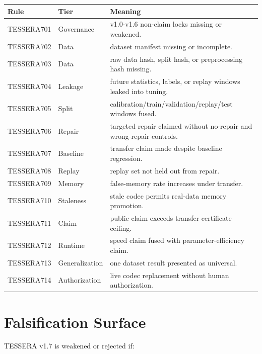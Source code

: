 \documentclass[12pt]{article}
\begin{document}
\begin{longtable}{p{}p{}p{}}
\toprule
\textbf{Rule} & \textbf{Tier} & \textbf{Meaning} \\
\midrule
TESSERA701 & Governance & v1.0-v1.6 non-claim locks missing or weakened. \\
TESSERA702 & Data & dataset manifest missing or incomplete. \\
TESSERA703 & Data & raw data hash, split hash, or preprocessing hash missing. \\
TESSERA704 & Leakage & future statistics, labels, or replay windows leaked into tuning. \\
TESSERA705 & Split & calibration/train/validation/replay/test windows fused. \\
TESSERA706 & Repair & targeted repair claimed without no-repair and wrong-repair controls. \\
TESSERA707 & Baseline & transfer claim made despite baseline regression. \\
TESSERA708 & Replay & replay set not held out from repair. \\
TESSERA709 & Memory & false-memory rate increases under transfer. \\
TESSERA710 & Staleness & stale codec permits real-data memory promotion. \\
TESSERA711 & Claim & public claim exceeds transfer certificate ceiling. \\
TESSERA712 & Runtime & speed claim fused with parameter-efficiency claim. \\
TESSERA713 & Generalization & one dataset result presented as universal. \\
TESSERA714 & Authorization & live codec replacement without human authorization. \\
\bottomrule
\end{longtable}

\section{Falsification Surface}

TESSERA v1.7 is weakened or rejected if:
\end{document}
